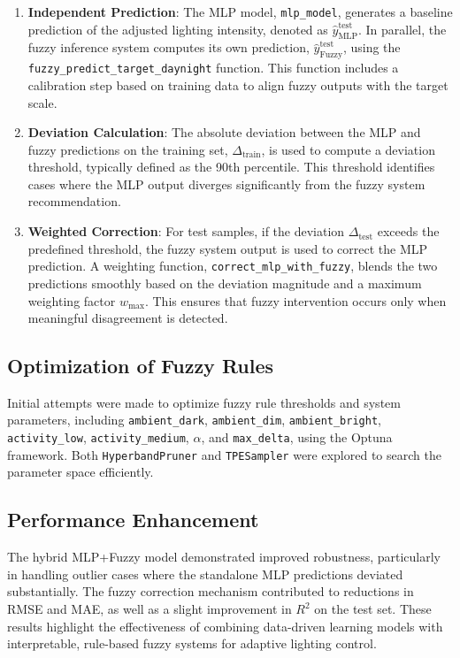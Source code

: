 \documentclass[conference]{IEEEtran}
\begin{document}
\begin{enumerate}
    \item \textbf{Independent Prediction}: The MLP model, \texttt{mlp\_model}, generates a baseline prediction of the adjusted lighting intensity, denoted as $\hat{y}_{\text{MLP}}^{\text{test}}$. In parallel, the fuzzy inference system computes its own prediction, $\hat{y}_{\text{Fuzzy}}^{\text{test}}$, using the \texttt{fuzzy\_predict\_target\_daynight} function. This function includes a calibration step based on training data to align fuzzy outputs with the target scale.
    
    \item \textbf{Deviation Calculation}: The absolute deviation between the MLP and fuzzy predictions on the training set, $\Delta_{\text{train}}$, is used to compute a deviation threshold, typically defined as the 90th percentile. This threshold identifies cases where the MLP output diverges significantly from the fuzzy system recommendation.
    
    \item \textbf{Weighted Correction}: For test samples, if the deviation $\Delta_{\text{test}}$ exceeds the predefined threshold, the fuzzy system output is used to correct the MLP prediction. A weighting function, \texttt{correct\_mlp\_with\_fuzzy}, blends the two predictions smoothly based on the deviation magnitude and a maximum weighting factor $w_{\max}$. This ensures that fuzzy intervention occurs only when meaningful disagreement is detected.
\end{enumerate}

\subsection{Optimization of Fuzzy Rules}

Initial attempts were made to optimize fuzzy rule thresholds and system parameters, including \texttt{ambient\_dark}, \texttt{ambient\_dim}, \texttt{ambient\_bright}, \texttt{activity\_low}, \texttt{activity\_medium}, $\alpha$, and \texttt{max\_delta}, using the Optuna framework. Both \texttt{HyperbandPruner} and \texttt{TPESampler} were explored to search the parameter space efficiently.

\subsection{Performance Enhancement}

The hybrid MLP+Fuzzy model demonstrated improved robustness, particularly in handling outlier cases where the standalone MLP predictions deviated substantially. The fuzzy correction mechanism contributed to reductions in RMSE and MAE, as well as a slight improvement in $R^2$ on the test set. These results highlight the effectiveness of combining data-driven learning models with interpretable, rule-based fuzzy systems for adaptive lighting control.
\end{document}
